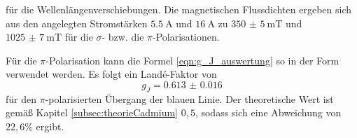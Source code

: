 für die Wellenlängenverschiebungen.
Die magnetischen Flussdichten ergeben sich aus den angelegten Stromstärken $\SI{5.5}{\ampere}$ und $\SI{16}{\ampere}$ zu $\SI{350(5)}{\milli\tesla}$ und $\SI{1025(7)}{\milli\tesla}$ für die $\sigma$- bzw. die $\pi$-Polarisationen.

Für die $\pi$-Polarisation kann die Formel \eqref{eqn:g_J_auswertung} so in der Form verwendet werden. Es folgt ein Landé-Faktor von
\begin{equation*}
  g_J = \num{0.613(16)}
\end{equation*}
für den $\pi$-polarisierten Übergang der blauen Linie. Der theoretische Wert ist gemäß Kapitel \ref{subsec:theorieCadmium} $0{,}5$, sodass sich eine Abweichung von $22{,}6\%$ ergibt.
